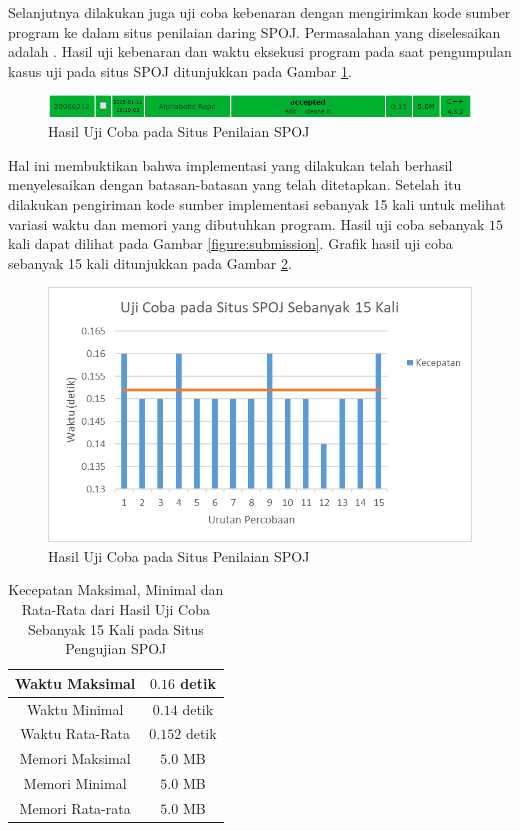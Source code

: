 Selanjutnya dilakukan juga uji coba kebenaran dengan mengirimkan kode sumber program ke dalam situs penilaian daring SPOJ. Permasalahan yang diselesaikan adalah \problem{}. Hasil uji kebenaran dan waktu eksekusi program pada saat pengumpulan kasus uji pada situs SPOJ ditunjukkan pada Gambar \ref{figure:ujicoba}.
\begin{figure}[H]
\centerline{ \includegraphics[scale=0.43]{assets/images/ujicoba.png}}
\caption{Hasil Uji Coba pada Situs Penilaian SPOJ}
\label{figure:ujicoba}
\end{figure}

Hal ini membuktikan bahwa implementasi yang dilakukan telah berhasil menyelesaikan \problem{} dengan batasan-batasan yang telah ditetapkan. Setelah itu dilakukan pengiriman kode sumber implementasi sebanyak 15 kali untuk melihat variasi waktu dan memori yang dibutuhkan program. Hasil uji coba sebanyak $15$ kali dapat dilihat pada Gambar \ref{figure:submission}. Grafik hasil uji coba sebanyak 15 kali ditunjukkan pada Gambar \ref{figure:grafik_spam}.
\begin{figure}[H]
\centerline{ \includegraphics[scale=0.5]{assets/images/spoj-spam.png}}
\caption{Hasil Uji Coba pada Situs Penilaian SPOJ}
\label{figure:grafik_spam}
\end{figure}
\begin{table}{}
	\centering
	\begin{tabular}{|c|c|}
	\hline
		Waktu Maksimal & $0.16$ detik\\ \hline
		Waktu Minimal & $0.14$ detik\\ \hline
		Waktu Rata-Rata & $0.152$ detik\\ \hline
		Memori Maksimal & $5.0$ MB\\ \hline
		Memori Minimal & $5.0$ MB\\ \hline
		Memori Rata-rata & $5.0$ MB\\ \hline
	\end{tabular}\caption{Kecepatan Maksimal, Minimal dan Rata-Rata dari Hasil Uji Coba Sebanyak 15 Kali pada Situs Pengujian SPOJ \label{tab:pengujian}}
\end{table}
